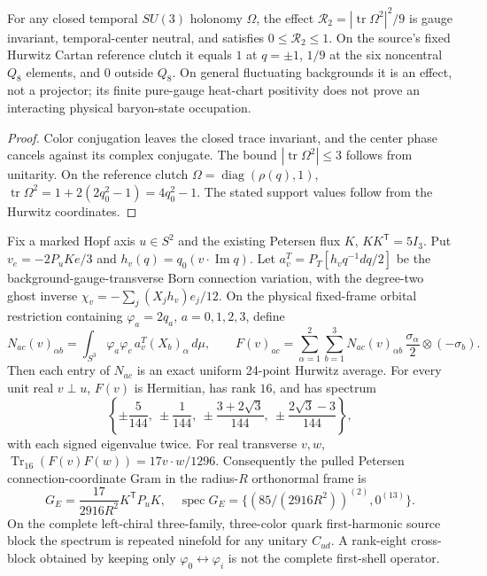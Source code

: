\documentclass[12pt,a4paper]{article}
\begin{document}
\begin{proposition}
\label{p10:prop:v368-center-neutral-Wilson-effect}
For any closed temporal $SU(3)$ holonomy $\Omega$, the effect
$\mathcal R_2=|\operatorname{tr}\Omega^2|^2/9$
is gauge invariant, temporal-center neutral, and satisfies
$0\le\mathcal R_2\le1$. On the source's fixed Hurwitz Cartan
reference clutch it equals $1$ at $q=\pm1$, $1/9$ at the six
noncentral $Q_8$ elements, and $0$ outside $Q_8$.
On general fluctuating backgrounds it is an effect, not a projector;
its finite pure-gauge heat-chart positivity does not prove an
interacting physical baryon-state occupation.
\end{proposition}
\begin{proof}
Color conjugation leaves the closed trace invariant, and the
center phase cancels against its complex conjugate. The bound
$|\operatorname{tr}\Omega^2|\le3$ follows from unitarity.
On the reference clutch $\Omega=\operatorname{diag}(\rho(q),1)$,
$\operatorname{tr}\Omega^2=1+2(2q_0^2-1)=4q_0^2-1$.
The stated support values follow from the Hurwitz coordinates.
\end{proof}
\begin{proposition}
\label{p10:prop:v368-complete-first-shell-weak-derivative}
Fix a marked Hopf axis $u\in S^2$ and the existing Petersen flux $K$,
$KK^{\mathsf T}=5I_3$. Put $v_e=-2P_uKe/3$ and
$h_v(q)=q_0(v\cdot\operatorname{Im}q)$. Let
$a_v^T=P_T[h_vq^{-1}dq/2]$ be the background-gauge-transverse
Born connection variation, with the degree-two ghost inverse
$\chi_v=-\sum_j (X_jh_v)e_j/12$.
On the physical fixed-frame orbital restriction containing
$\varphi_a=2q_a$, $a=0,1,2,3$, define
\[
 N_{ac}(v)_{\alpha b}=
 \int_{S^3}\varphi_a\varphi_c\,
 a_v^T(X_b)_{\alpha}\,d\mu,
 \qquad
 F(v)_{ac}=\sum_{\alpha=1}^{2}\sum_{b=1}^3
 N_{ac}(v)_{\alpha b}\,\frac{\sigma_\alpha}{2}
 \otimes(-\sigma_b).
\]
Then each entry of $N_{ac}$ is an exact uniform 24-point Hurwitz
average. For every unit real $v\perp u$, $F(v)$ is Hermitian, has
rank $16$, and has spectrum
\[
 \left\{\pm\frac5{144},\ \pm\frac1{144},\
 \pm\frac{3+2\sqrt3}{144},\
 \pm\frac{2\sqrt3-3}{144}\right\},
\]
with each signed eigenvalue twice. For real transverse $v,w$,
$\operatorname{Tr}_{16}(F(v)F(w))=17v\cdot w/1296$.
Consequently the pulled Petersen connection-coordinate Gram in the
radius-$R$ orthonormal frame is
\[
 G_E=\frac{17}{2916R^2}K^{\mathsf T}P_uK,
\quad
 \operatorname{spec}G_E=\{(85/(2916R^2))^{(2)},0^{(13)}\}.
\]
On the complete left-chiral three-family, three-color quark first-harmonic
source block the spectrum is repeated ninefold for any unitary $C_{ud}$.
A rank-eight cross-block obtained by keeping only $\varphi_0\leftrightarrow
\varphi_i$ is not the complete first-shell operator.
\end{proposition}
\end{document}
